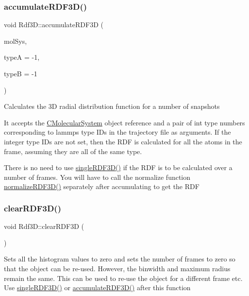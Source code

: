 \subsubsection{\texorpdfstring{accumulate\+R\+D\+F3\+D()}{accumulateRDF3D()}}
{\footnotesize\ttfamily void Rdf3\+D\+::accumulate\+R\+D\+F3D (\begin{DoxyParamCaption}\item[{class \mbox{\hyperlink{classCMolecularSystem}{C\+Molecular\+System}} \&}]{mol\+Sys,  }\item[{int}]{typeA = {\ttfamily -\/1},  }\item[{int}]{typeB = {\ttfamily -\/1} }\end{DoxyParamCaption})}

Calculates the 3D radial distribution function for a number of snapshots

It accepts the \mbox{\hyperlink{classCMolecularSystem}{C\+Molecular\+System}} object reference and a pair of int type numbers corresponding to lammps type I\+Ds in the trajectory file as arguments. If the integer type I\+Ds are not set, then the R\+DF is calculated for all the atoms in the frame, assuming they are all of the same type.

There is no need to use \mbox{\hyperlink{classRdf3D_a27efc547d859576b41a16d98cd2d1df9}{single\+R\+D\+F3\+D()}} if the R\+DF is to be calculated over a number of frames. You will have to call the normalize function \mbox{\hyperlink{classRdf3D_a08d573ef51fd88bd42456a76fc3d7ca4}{normalize\+R\+D\+F3\+D()}} separately after accumulating to get the R\+DF \mbox{\label{classRdf3D_afff83789d5d90cd9cdbf9f7287cd785a}} 
\subsubsection{\texorpdfstring{clear\+R\+D\+F3\+D()}{clearRDF3D()}}
{\footnotesize\ttfamily void Rdf3\+D\+::clear\+R\+D\+F3D (\begin{DoxyParamCaption}{ }\end{DoxyParamCaption})}

Sets all the histogram values to zero and sets the number of frames to zero so that the object can be re-\/used. However, the binwidth and maximum radius remain the same. This can be used to re-\/use the object for a different frame etc. Use \mbox{\hyperlink{classRdf3D_a27efc547d859576b41a16d98cd2d1df9}{single\+R\+D\+F3\+D()}} or \mbox{\hyperlink{classRdf3D_aca3e0b2da042856d705b4bca8f6be335}{accumulate\+R\+D\+F3\+D()}} after this function \mbox{\label{classRdf3D_a6af1bf5b0301a6b43d9f0fffdb868c9c}} 
